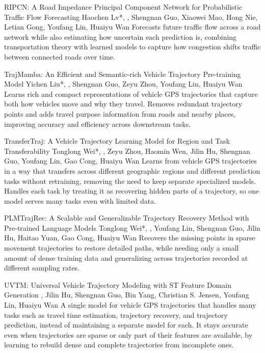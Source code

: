 {RIPCN: A Road Impedance Principal Component Network for Probabilistic Traffic Flow Forecasting}
{Haochen Lv*, \me*, Shengnan Guo, Xiaowei Mao, Hong Nie, Letian Gong, Youfang Lin, Huaiyu Wan}
{Forecasts future traffic flow across a road network while also estimating how uncertain each prediction is, combining transportation theory with learned models to capture how congestion shifts traffic between connected roads over time.}

{TrajMamba: An Efficient and Semantic-rich Vehicle Trajectory Pre-training Model}
{Yichen Liu*, \me*, Shengnan Guo, Zeyu Zhou, Youfang Lin, Huaiyu Wan}
{Learns rich and compact representations of vehicle GPS trajectories that capture both how vehicles move and why they travel. Removes redundant trajectory points and adds travel purpose information from roads and nearby places, improving accuracy and efficiency across downstream tasks.}

{TransferTraj: A Vehicle Trajectory Learning Model for Region and Task Transferability}
{Tonglong Wei*, \me*, Zeyu Zhou, Haomin Wen, Jilin Hu, Shengnan Guo, Youfang Lin, Gao Cong, Huaiyu Wan}
{Learns from vehicle GPS trajectories in a way that transfers across different geographic regions and different prediction tasks without retraining, removing the need to keep separate specialized models. Handles each task by treating it as recovering hidden parts of a trajectory, so one model serves many tasks even with limited data.}

{PLMTrajRec: A Scalable and Generalizable Trajectory Recovery Method with Pre-trained Language Models}
{Tonglong Wei*, \me*, Youfang Lin, Shengnan Guo, Jilin Hu, Haitao Yuan, Gao Cong, Huaiyu Wan}
{Recovers the missing points in sparse movement trajectories to restore detailed paths, while needing only a small amount of dense training data and generalizing across trajectories recorded at different sampling rates.}

{UVTM: Universal Vehicle Trajectory Modeling with ST Feature Domain Generation}
{\me, Jilin Hu, Shengnan Guo, Bin Yang, Christian S. Jensen, Youfang Lin, Huaiyu Wan}
{A single model for vehicle GPS trajectories that handles many tasks such as travel time estimation, trajectory recovery, and trajectory prediction, instead of maintaining a separate model for each. It stays accurate even when trajectories are sparse or only part of their features are available, by learning to rebuild dense and complete trajectories from incomplete ones.}

